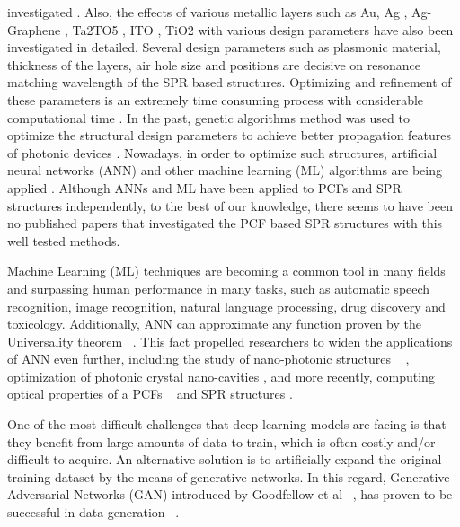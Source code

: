 \documentclass[journal]{IEEEtran}
\begin{document}
investigated \cite{rifat2016highly,yasli2019effect,zhang2011wagon,yasli2019multi,azzam2016multichannel}. Also, the effects of various metallic layers such as Au, Ag \cite{yasli2019multi}, Ag- Graphene \cite{rifat2016highly}, Ta2TO5 \cite{otupiri2015multi}, ITO \cite{dash2014spr}, TiO2 \cite{rifat2016highly} with various design parameters have also been investigated in detailed. Several design parameters such as plasmonic material, thickness of the layers, air hole size and positions are decisive on resonance matching wavelength of the SPR based structures. Optimizing and refinement of these parameters is an extremely time consuming process with considerable computational time \cite{fornarelli2009neural,abdelaziz2012photonic,paper0}. In the past, genetic algorithms \cite{abdelaziz2012photonic,borel2004topology} method was used to optimize the structural design parameters to achieve better propagation features of photonic devices \cite{rifat2016highly,caucheteur2015review}. Nowadays, in order to optimize such structures, artificial neural networks (ANN) and other machine learning (ML) algorithms are being applied \cite{fornarelli2009neural,paper0,hameed2008accurate}. Although ANNs and ML have been applied to PCFs \cite{fornarelli2009neural,paper0} and SPR structures \cite{fu2018optimization,mcatee2019artificial} independently, to the best of our knowledge, there seems to have been no published papers that investigated the PCF based SPR structures with this well tested methods.


Machine Learning (ML) techniques are becoming a common tool in many fields and surpassing human performance in many tasks, such as automatic speech recognition, image recognition, natural language processing, drug discovery and toxicology. Additionally, ANN can approximate any function proven by the Universality theorem  \cite{HORNIK1991251}. This fact propelled researchers to widen the applications of ANN even further, including the study of nano-photonic structures   \cite{kiarashinejad2020knowledge}, optimization of photonic crystal nano-cavities \cite{asano2018optimization}, and more recently, computing optical properties of a PCFs  \cite{paper0} and SPR structures \cite{fu2018optimization,mcatee2019artificial}.

One of the most difficult challenges that deep learning models are facing is that they benefit from large amounts of data to train, which is often costly and/or difficult to acquire. An alternative solution is to artificially expand the original training dataset by the means of generative networks. In this regard, Generative Adversarial Networks (GAN) introduced by Goodfellow et al  \cite{goodfellow2014generative}, has proven to be successful in data generation  \cite{schlegl2017unsupervised, zheng2017unlabeled, frid2018synthetic, tanaka2019data, perez2017effectiveness}.
\end{document}
